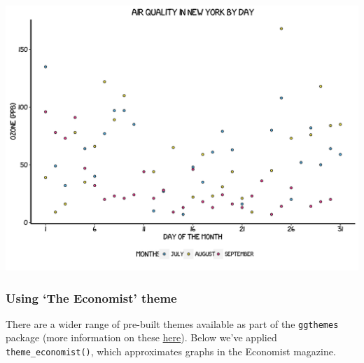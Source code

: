 \documentclass[]{article}
\begin{document}
\begin{center}\includegraphics{0_all_posts_pdf/scatter_13-1} \end{center}

\subsubsection{\texorpdfstring{Using `The Economist'
theme}{Using The Economist theme}}\label{using-the-economist-theme-4}

There are a wider range of pre-built themes available as part of the
\texttt{ggthemes} package (more information on these
\href{https://cran.r-project.org/web/packages/ggthemes/vignettes/ggthemes.html}{here}).
Below we've applied \texttt{theme\_economist()}, which approximates
graphs in the Economist magazine.
\end{document}
